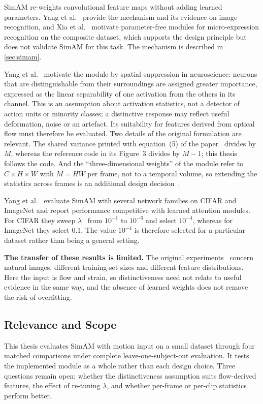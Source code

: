SimAM re-weights convolutional feature maps without adding learned parameters. Yang et al.~\cite{yang2021} provide the mechanism and its evidence on image recognition, and Xia et al.~\cite{xia2020b} motivate parameter-free modules for micro-expression recognition on the composite dataset, which supports the design principle but does not validate SimAM for this task. The mechanism is described in \autoref{sec:simam}.

Yang et al.~\cite{yang2021} motivate the module by spatial suppression in neuroscience: neurons that are distinguishable from their surroundings are assigned greater importance, expressed as the linear separability of one activation from the others in its channel. This is an assumption about activation statistics, not a detector of action units or minority classes; a distinctive response may reflect useful deformation, noise or an artefact. Its suitability for features derived from optical flow must therefore be evaluated. Two details of the original formulation are relevant. The shared variance printed with equation~(5) of the paper~\cite{yang2021} divides by $M$, whereas the reference code in its Figure~3 divides by $M-1$; this thesis follows the code. And the ``three-dimensional weights'' of the module refer to $C \times H \times W$ with $M = HW$ per frame, not to a temporal volume, so extending the statistics across frames is an additional design decision~\cite{yang2021}.

Yang et al.~\cite{yang2021} evaluate SimAM with several network families on CIFAR and ImageNet and report performance competitive with learned attention modules. For CIFAR they sweep $\lambda$~\cite{yang2021} from $10^{-1}$ to $10^{-6}$ and select $10^{-4}$, whereas for ImageNet they select $0.1$. The value $10^{-4}$ is therefore selected for a particular dataset rather than being a general setting.

\textbf{The transfer of these results is limited.} The original experiments~\cite{yang2021} concern natural images, different training-set sizes and different feature distributions. Here the input is flow and strain, so distinctiveness need not relate to useful evidence in the same way, and the absence of learned weights does not remove the risk of overfitting.

\subsection{Relevance and Scope}
\label{sec:simam-gap}

This thesis evaluates SimAM with motion input on a small dataset through four matched comparisons under complete leave-one-subject-out evaluation. It tests the implemented module as a whole rather than each design choice. Three questions remain open: whether the distinctiveness assumption suits flow-derived features, the effect of re-tuning $\lambda$, and whether per-frame or per-clip statistics perform better.



